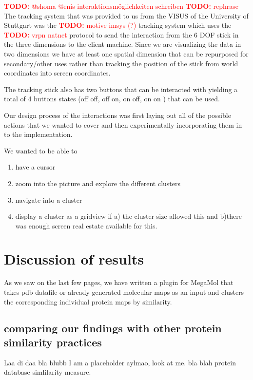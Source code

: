 \documentclass[journal]{vgtc}       %
\newcommand{\todo}[1]{\textcolor{red}{\textbf{TODO:} #1}}
\begin{document}
\todo{@shoma @enis interaktionsmöglichkeiten schreiben}
\todo{rephrase}
The tracking system that was provided to us from the VISUS of the University of Stuttgart was the \todo{motive imsys (?)} tracking system which uses the \todo{vrpn natnet} protocol to send the interaction from the 6 DOF stick in the three dimensions to the client machine. 
Since we are visualizing the data in two dimensions we have at least one spatial dimension that can be repurposed for secondary/other uses rather than tracking the position of the stick from world coordinates into screen coordinates.

The tracking stick also has two buttons that can be interacted with yielding a total of 4 buttons states (off off, off on, on off, on on ) that can be used.

Our design process of the interactions was first  laying out all of the possible actions that we wanted to cover and then experimentally incorporating them in to the implementation.

We wanted to be able to 
\begin{enumerate}
  \item have a cursor 
  \item zoom into the picture and  explore the different clusters
  \item navigate into a cluster
  \item display a cluster as a gridview if a) the cluster size allowed this and b)there was enough screen real estate available for this.
  
\end{enumerate}



\section{Discussion of results}
As we saw on the last few pages, we have written a plugin for MegaMol that takes pdb datafile or already generated molecular maps as an input and clusters  the corresponding individual protein maps by similarity.

\subsection{comparing our findings with other protein similarity practices}\label{subsec:comparison}
Laa di daa bla blubb I am a placeholder aylmao, look at me. bla \cite{3dsurfer} blah protein database simlilarity measure.
\end{document}
